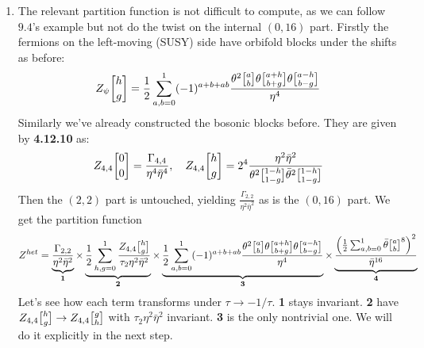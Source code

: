 \documentclass[11pt, class=article, crop=false]{standalone}
\begin{document}
\begin{enumerate}
	Let's look at the supercurrent $G^{int}$. It can be written in terms of an eigenbasis of the commuting $\tilde J^i$. In particular look at $\tilde J^1$. 
	\[
		G^{int} = \sum_q e^{i q \phi_1} T^{(q)} 
	\]
	 Now consider the OPEs $G^{int} \cdot \Sigma^1$ and $G^{int} \cdot \bar \Sigma^1$. As observed in the chapter, both of these have only the singular term going as $(z-w)^{-1/2}$. Together both of these require that $q$ in $G$ can only be $\pm 1$. We can repeat this argument for $\tilde J^2, \tilde J^3$ to see that $G^{int}$ must be a sum of $6$ terms:
	 \[
	 	 e^{i q_1 \phi_1} Z_1 + e^{-i q_1 \phi_1} \bar Z_1 + e^{i q_2 \phi_2} Z_2 + e^{-i q_2 \phi_2} \bar Z_2 + e^{i q_3 \phi_3} Z_3 + e^{-i q_3 \phi_3} \bar Z_3
	 \]
	 Each $Z_i, \bar Z_i$ must be dimension one operators, so they are themselves bosonic fields $i \d X^i_\pm$. We thus have that $G^{int} = \sum_{i=1, \pm}^3 \psi_i^\pm \d X^i_{\pm}$. This is exactly the supercurrent for six free boson-fermion systems and will give (under anticommutator) the stress tensor of a six free boson-fermion systems. This is exactly a toroidal CFT.
	\item The relevant partition function is not difficult to compute, as we can follow $9.4$'s example but not do the twist on the internal $(0,16)$ part. Firstly the fermions on the left-moving (SUSY) side have orbifold blocks under the shifts as before:
	\[
		Z_{\psi}\twist{h}{g} = \frac12 \sum_{a,b=0}^1 (-1)^{a+b+ab} \frac{\theta^2 \twist{a}{b} \theta \twist{a+h}{b+g} \theta \twist{a-h}{b-g}}{\eta^4}
	\]
	Similarly we've already constructed the bosonic blocks before. They are given by \textbf{4.12.10} as:
	\[
		Z_{4,4}\twist00 = \frac{\Gamma_{4,4}}{\eta^4 \bar \eta^4}, \quad Z_{4,4} \twist{h}{g} = 2^4 \frac{\eta^2 \bar \eta^2}{\theta^2 \twist{1-h}{1-g} \bar \theta^2 \twist{1-h}{1-g}}
	\]
	Then the $(2,2)$ part is untouched, yielding $\frac{\Gamma_{2,2}}{\eta^2 \bar \eta^2}$ as is the $(0,16)$ part. We get the partition function
	\[
		Z^{het} = \underbrace{\frac{\Gamma_{2,2}}{\eta^2 \bar \eta^2}}_{\mathbf{1}}
		 \times \underbrace{\frac12 \sum_{h,g=0}^1 \frac{Z_{4,4} \twist{h}{g}}{\tau_2 \eta^2 \bar \eta^2}}_{\mathbf{2}} 
		\times \underbrace{\frac12 \sum_{a,b=0}^1 (-1)^{a+b+ab} \frac{\theta^2 \twist{a}{b} \theta \twist{a+h}{b+g} \theta \twist{a-h}{b-g}}{\eta^4}}_{\mathbf{3}} 
		\times \underbrace{\frac{\left(\frac12 \sum_{a,b=0}^1 \bar \theta \twist ab^8 \right)^2}{\bar \eta^{16}}}_{\mathbf{4}}
	\]
	Let's see how each term transforms under $\tau \to -1/\tau$. \textbf{1} stays invariant. \textbf{2} have $Z_{4,4} \twist{h}{g} \to Z_{4,4} \twist{g}{h}$ with  $\tau_2 \eta^2 \bar \eta^2$ invariant. \textbf{3} is the only nontrivial one. We will do it explicitly in the next step. %

\end{enumerate}
\end{document}
